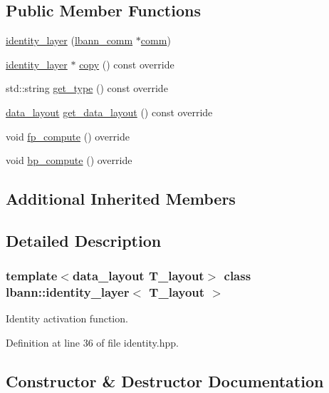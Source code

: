\subsection*{Public Member Functions}
\begin{DoxyCompactItemize}
\item 
\hyperlink{classlbann_1_1identity__layer_ad6392bffa4f10325e129b64e3bcc4599}{identity\+\_\+layer} (\hyperlink{classlbann_1_1lbann__comm}{lbann\+\_\+comm} $\ast$\hyperlink{file__io_8cpp_ab048c6f9fcbcfaa57ce68b00263dbebe}{comm})
\item 
\hyperlink{classlbann_1_1identity__layer}{identity\+\_\+layer} $\ast$ \hyperlink{classlbann_1_1identity__layer_ac9407c3e6f576eb2c3b873f37daed159}{copy} () const override
\item 
std\+::string \hyperlink{classlbann_1_1identity__layer_ac2032946d94c88d898e8f35d9e0ed799}{get\+\_\+type} () const override
\item 
\hyperlink{base_8hpp_a786677cbfb3f5677b4d84f3056eb08db}{data\+\_\+layout} \hyperlink{classlbann_1_1identity__layer_a89b5c86ca801ce0f4854bf9d6b1a50e9}{get\+\_\+data\+\_\+layout} () const override
\item 
void \hyperlink{classlbann_1_1identity__layer_aaa19914b20bc409aa3fb8a744e994114}{fp\+\_\+compute} () override
\item 
void \hyperlink{classlbann_1_1identity__layer_a1f6c975af032caea84155bda8b9c9801}{bp\+\_\+compute} () override
\end{DoxyCompactItemize}
\subsection*{Additional Inherited Members}


\subsection{Detailed Description}
\subsubsection*{template$<$data\+\_\+layout T\+\_\+layout$>$\newline
class lbann\+::identity\+\_\+layer$<$ T\+\_\+layout $>$}

Identity activation function. 

Definition at line 36 of file identity.\+hpp.



\subsection{Constructor \& Destructor Documentation}
\mbox{\label{classlbann_1_1identity__layer_ad6392bffa4f10325e129b64e3bcc4599}} 
